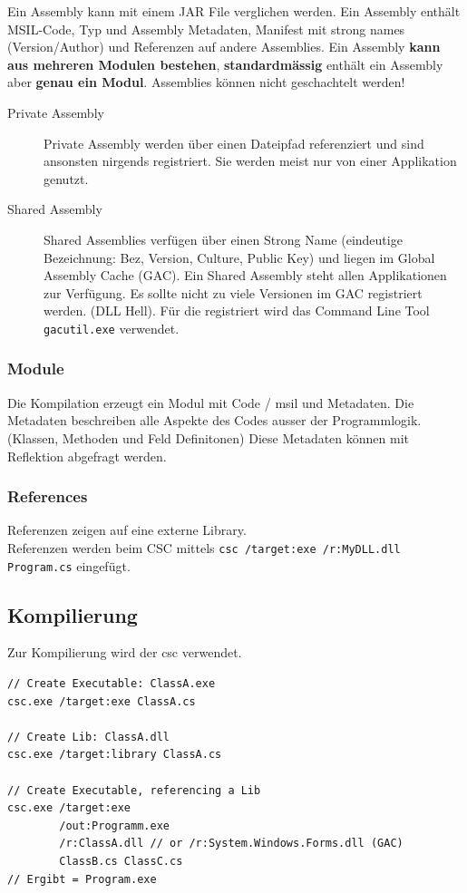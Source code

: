 Ein Assembly kann mit einem JAR File verglichen werden. Ein Assembly enthält MSIL-Code, Typ und Assembly Metadaten, Manifest mit strong names (Version/Author) und Referenzen auf andere Assemblies. Ein Assembly \textbf{kann aus mehreren Modulen bestehen}, \textbf{standardmässig} enthält ein Assembly aber \textbf{genau ein Modul}. Assemblies können nicht geschachtelt werden!
\begin{description}
	\item[Private Assembly] Private Assembly werden über einen Dateipfad referenziert und sind ansonsten nirgends registriert. Sie werden meist nur von einer Applikation genutzt.
	\item[Shared Assembly] Shared Assemblies verfügen über einen Strong Name (eindeutige Bezeichnung: Bez, Version, Culture, Public Key) und liegen im Global Assembly Cache (GAC). Ein Shared Assembly steht allen Applikationen zur Verfügung. Es sollte nicht zu viele Versionen im GAC registriert werden. (DLL Hell). Für die registriert wird das Command Line Tool \lstinline|gacutil.exe| verwendet.
\end{description}

\subsubsection{Module}
Die Kompilation erzeugt ein Modul mit Code / \gls{msil} und Metadaten. Die Metadaten beschreiben alle Aspekte des Codes ausser der Programmlogik. (Klassen, Methoden und Feld Definitonen) Diese Metadaten können mit Reflektion abgefragt werden.

\subsubsection{References}
Referenzen zeigen auf eine externe Library. \\
Referenzen werden beim CSC mittels \lstinline|csc /target:exe /r:MyDLL.dll Program.cs| eingefügt.


\clearpage

\subsection{Kompilierung}
Zur Kompilierung wird der \gls{csc} verwendet.  
\begin{lstlisting}
// Create Executable: ClassA.exe
csc.exe /target:exe ClassA.cs

// Create Lib: ClassA.dll
csc.exe /target:library ClassA.cs

// Create Executable, referencing a Lib
csc.exe /target:exe
		/out:Programm.exe
		/r:ClassA.dll // or /r:System.Windows.Forms.dll (GAC)
		ClassB.cs ClassC.cs
// Ergibt = Program.exe
\end{lstlisting}

